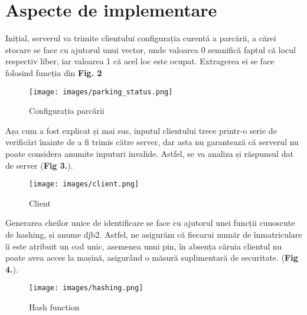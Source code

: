 \documentclass[runningheads]{llncs}
\begin{document}
\section{Aspecte de implementare}

Inițial, serverul va trimite clientului configurația curentă a parcării, a cărei stocare se face cu ajutorul unui vector, unde valoarea 0 semnifică faptul că locul respectiv liber, iar valoarea 1 că acel loc este ocupat. Extragerea ei se face folosind funcția din \textbf{Fig. 2}

\begin{figure}[H]
    \centering
    \begin{minipage}{1\textwidth}
        \centering
        \texttt{[image: images/parking\_status.png]}
        \caption{Configurația parcării}
        \label{fig:configurație}
    \end{minipage}\hfill
\end{figure}

\par Așa cum a fost explicat și mai sus, inputul clientului trece printr-o serie de verificări înainte de a fi trimis către server, dar asta nu garantează că serverul nu poate considera anumite inputuri invalide. Astfel, se va analiza și răspunsul dat de server (\textbf{Fig 3.}).

\begin{figure}[H]
    \centering
    \begin{minipage}{0.75\textwidth}
        \centering
        \texttt{[image: images/client.png]}
        \caption{Client}
        \label{fig:client}
    \end{minipage}\hfill
\end{figure}

\par Generarea cheilor unice de identificare se face cu ajutorul unei funcții cunoscute de hashing, și anume djb2. Astfel, ne asigurăm că fiecarui număr de înmatriculare îi este atribuit un cod unic, asemenea unui pin, în absența căruia clientul nu poate avea acces la mașină, asigurând o măsură suplimentară de securitate. (\textbf{Fig 4.}).

\begin{figure}[H]
    \centering
    \begin{minipage}{1\textwidth}
        \centering
        \texttt{[image: images/hashing.png]}
        \caption{Hash function}
        \label{fig:hashing}
    \end{minipage}\hfill
\end{figure}
\end{document}
